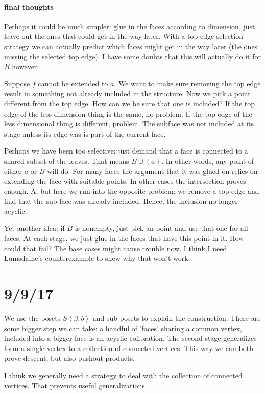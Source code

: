 \documentclass{tac}
\newcommand\set[1]{\left\{#1\right\}}
\newcommand\tuplet[1]{\left\langle #1 \right\rangle}
\begin{document}
\paragraph{final thoughts}
Perhaps it could be much simpler: glue in the faces according to dimension, just leave out the ones that could get in the way later. With a top edge selection strategy we can actually predict which faces might get in the way later (the ones missing the selected top edge). I have some doubts that this will actually do it for $B$ however.

Suppose $f$ cannot be extended to $a$. We want to make sure removing the top edge result in something not already included in the structure. 
Now we pick a point different from the top edge. How can we be sure that one is included? If the top edge of the less dimension thing is the same, no problem. If the top edge of the less dimensional thing is different, problem. The subface was not included at its stage unless its edge was is part of the current face.

Perhaps we have been too selective: just demand that a face is connected to a shared subset of the leaves. That means $B\cup\set{a}$. In other words, any point of either $a$ or $B$ will do. For many faces the argument that it was glued on relies on extending the face with suitable points. In other cases the intersection proves enough. A, but here we run into the opposite problem: we remove a top edge and find that the sub face was already included. Hence, the inclusion no longer acyclic.

Yet another idea: if $B$ is nonempty, just pick an point and use that one for all faces. At each stage, we just glue in the faces that have this point in it. How could that fail? The base cases might cause trouble now. I think I need Lumsdaine's counterexample to show why that won't work.

\section{9/9/17}
We use the posets $S\tuplet{\beta,b}$ and sub-posets to explain the construction. There are some bigger step we can take: a handful of 'faces' sharing a common vertex, included into a bigger face is an acyclic cofibration. The second stage generalizes form a single vertex to a collection of connected vertices. This way we can both prove descent, but also pushout products.

I think we generally need a strategy to deal with the collection of connected vertices. That prevents useful generalizations.
\end{document}

